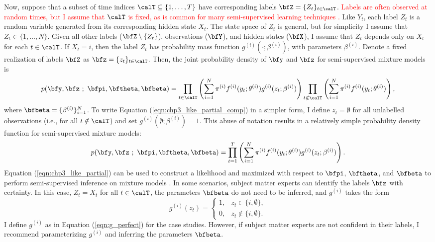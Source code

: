 Now, suppose that a subset of time indices $\calT \subseteq \{1,\ldots,T\}$ have corresponding labels $\bfZ = \{Z_t\}_{t \in \calT}$. \textcolor{red}{Labels are often observed at random times, but I assume that $\calT$ is fixed, as is common for many semi-supervised learning techniques \citep{Hu:2002,Chapelle:2006}.} Like $Y_t$, each label $Z_t$ is a random variable generated from its corresponding hidden state $X_t$. The state space of $Z_t$ is general, but for simplicity I assume that $Z_t \in \{1,\ldots,N\}$. Given all other labels ($\bfZ \setminus \{Z_t\}$), observations ($\bfY$), and hidden states ($\bfX$), I assume that $Z_t$ depends only on $X_t$ for each $t \in \calT$. If $X_t = i$, then the label $Z_t$ has probability mass function $g^{(i)}(\cdot ; \beta^{(i)})$, with parameters $\beta^{(i)}$. Denote a fixed realization of labels $\bfZ$ as $\bfz = \{z_t\}_{t \in \calT}$. Then, the joint probability density of $\bfy$ and $\bfz$ for semi-supervised mixture models is
%
\begin{gather}
    p(\bfy,\bfz ~;~ \bfpi,\bftheta,\bfbeta) = \prod_{t \in \calT} \left(\sum_{i = 1}^N \pi^{(i)} f^{(i)}(y_t; \theta^{(i)}) g^{(i)}(z_t ; \beta^{(i)}) \right) \prod_{t \notin \calT} \left(\sum_{i = 1}^N \pi^{(i)} f^{(i)}(y_t; \theta^{(i)}) \right),
    \label{eqn:chp3_like_partial_comp} 
\end{gather}
%
where $\bfbeta = \{\beta^{(i)}\}_{i=1}^N$. To write Equation (\ref{eqn:chp3_like_partial_comp}) in a simpler form, I define $z_t = \emptyset$ for all unlabelled observations (i.e., for all $t \notin \calT$) and set $g^{(i)}(\emptyset ; \beta^{(i)}) = 1$. This abuse of notation results in a relatively simple probability density function for semi-supervised mixture models:
%
\begin{gather}
    p(\bfy,\bfz ~;~ \bfpi,\bftheta,\bfbeta) = \prod_{t = 1}^T \left(\sum_{i = 1}^N \pi^{(i)} f^{(i)}(y_t; \theta^{(i)}) g^{(i)}(z_t ; \beta^{(i)}) \right).
    \label{eqn:chp3_like_partial} 
\end{gather}
%
Equation (\ref{eqn:chp3_like_partial}) can be used to construct a likelihood and maximized with respect to $\bfpi$, $\bftheta$, and $\bfbeta$ to perform semi-supervised inference on mixture models \citep{Chapelle:2006}.
%
In some scenarios, subject matter experts can identify the labels $\bfz$ with certainty. In this case, $Z_t = X_t$ for all $t \in \calT$, the parameters $\bfbeta$ do not need to be inferred, and $g^{(i)}$ takes the form
\begin{equation}
    g^{(i)}(z_t) = 
    \begin{cases} 
        1, & z_t \in \{i,\emptyset\}, \\
        0, & z_t \notin \{i,\emptyset\}.
    \end{cases}
    \label{eqn:g_perfect}
\end{equation}
%
I define $g^{(i)}$ as in Equation (\ref{eqn:g_perfect}) for the case studies. However, if subject matter experts are not confident in their labels, I recommend parameterizing $g^{(i)}$ and inferring the parameters $\bfbeta$. 

